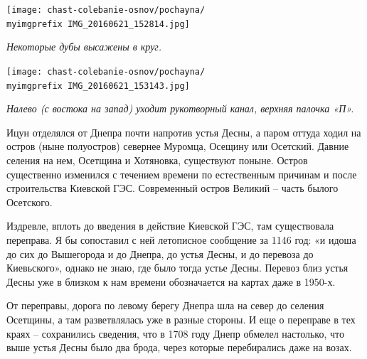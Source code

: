 \newpage
  
\begin{center}
\texttt{[image: chast-colebanie-osnov/pochayna/\\myimgprefix IMG\_20160621\_152814.jpg]}

\textit{Некоторые дубы высажены в круг.}
\end{center}
 
\begin{center}
\texttt{[image: chast-colebanie-osnov/pochayna/\\myimgprefix IMG\_20160621\_153143.jpg]}

\textit{Налево (с востока на запад) уходит рукотворный канал, верхняя палочка «П».}
\end{center}















Ицун отделялся от Днепра почти напротив устья Десны, а паром оттуда ходил на остров (ныне полуостров) севернее Муромца, Осещину или Осетский. Давние селения на нем, Осетщина и Хотяновка, существуют поныне. Остров существенно изменился с течением времени по естественным причинам и после строительства Киевской ГЭС. Современный остров Великий – часть былого Осетского.

Издревле, вплоть до введения в действие Киевской ГЭС, там существовала переправа. Я бы сопоставил с ней летописное сообщение за 1146 год: «и идоша до сих до Вышегорода и до Днепра, до устья Десны, и до перевоза до Киевьского», однако не знаю, где было тогда устье Десны. Перевоз близ устья Десны уже в близком к нам времени обозначается на картах даже в 1950-х.

От переправы, дорога по левому берегу Днепра шла на север до селения Осетщины, а там разветвлялась уже в разные стороны. И еще о переправе в тех краях – сохранились сведения, что в 1708 году Днепр обмелел настолько, что выше устья Десны было два брода, через которые перебирались даже на возах.



























